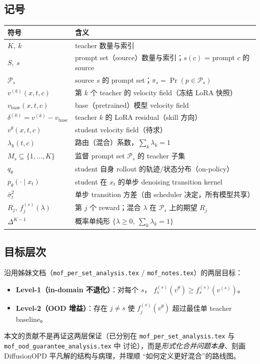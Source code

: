 \documentclass[11pt,a4paper]{article}
\newcommand{\base}{\mathrm{base}}
\newcommand{\stu}{\theta}
\theoremstyle{definition}
\begin{document}
\subsection{记号}
\label{ssec:notation}

\begin{center}
\renewcommand{\arraystretch}{1.25}
\footnotesize
\begin{tabular}{@{}l@{\quad}p{11cm}@{}}
\toprule
\textbf{符号} & \textbf{含义} \\
\midrule
$K,\ k$ & teacher 数量与索引 \\
$S,\ s$ & prompt set（source）数量与索引；$s(c)$ = prompt $c$ 的 source \\
$\mathcal{P}_s$ & source $s$ 的 prompt set；$\pi_s=\Pr(p\in\mathcal{P}_s)$ \\
$v^{(k)}(x,t,c)$ & 第 $k$ 个 teacher 的 velocity field（冻结 LoRA 快照） \\
$v_{\base}(x,t,c)$ & base（pretrained）模型 velocity field \\
$\delta^{(k)}=v^{(k)}-v_{\base}$ & teacher $k$ 的 LoRA residual（skill 方向） \\
$v^\stu(x,t,c)$ & student velocity field（待求） \\
$\lambda_k(t,c)$ & 路由（混合）系数，$\sum_k\lambda_k=1$ \\
$M_s\subseteq\{1,\dots,K\}$ & 监督 prompt set $\mathcal{P}_s$ 的 teacher 子集 \\
$q_\theta$ & student 自身 rollout 的轨迹/状态分布（on-policy） \\
$p_\theta(\cdot\mid x_t)$ & student 在 $x_t$ 的单步 denoising transition kernel \\
$\bar\sigma_t^2$ & 单步 transition 方差（由 scheduler 决定，所有模型共享） \\
$R_j,\ f_j^{(s)}(\lambda)$ & 第 $j$ 个 reward；混合 $\lambda$ 在 $\mathcal{P}_s$ 上的期望 $R_j$ \\
$\Delta^{K-1}$ & 概率单纯形 $\{\lambda\ge 0,\ \sum_k\lambda_k=1\}$ \\
\bottomrule
\end{tabular}
\end{center}

\subsection{目标层次}
\label{ssec:goal}

沿用姊妹文档（\texttt{mof\_per\_set\_analysis.tex} / \texttt{mof\_notes.tex}）的两层目标：
\begin{itemize}[leftmargin=1.5em]
\item \textbf{Level-1（in-domain 不退化）}：对每个 $s$，
$f_s^{(s)}(v^\stu)\geq f_s^{(s)}(v^{(s)})$。
\item \textbf{Level-2（OOD 增益）}：存在 $j\neq s$ 使 $f_j^{(s)}(v^\stu)$ 超过最佳单
teacher baseline。
\end{itemize}
本文的贡献不是再证这两层保证（已分别在
\texttt{mof\_per\_set\_analysis.tex} 与 \texttt{mof\_ood\_guarantee\_analysis.tex} 中
讨论），而是\emph{形式化合并问题本身}、刻画 DiffusionOPD 平凡解的结构与病理，并理顺
``如何定义更好混合''的路线图。
\end{document}
